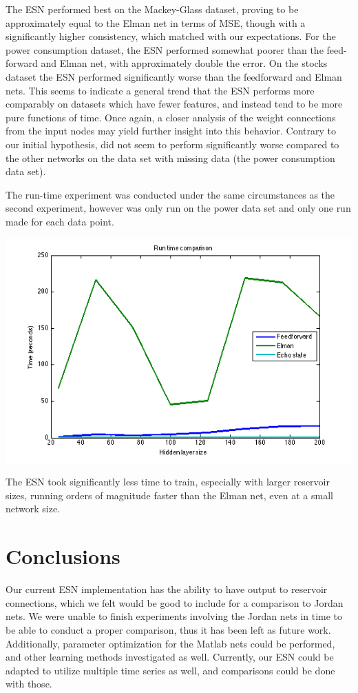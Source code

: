 \documentclass{acm_proc_article-sp}
\begin{document}
The ESN performed best on the Mackey-Glass dataset, proving to be approximately equal to the Elman net in terms of MSE, though with a significantly higher consistency, which matched with our expectations. For the power consumption dataset, the ESN performed somewhat poorer than the feed-forward and Elman net, with approximately double the error. On the stocks dataset the ESN performed significantly worse than the feedforward and Elman nets. This seems to indicate a general trend that the ESN performs more comparably on datasets which have fewer features, and instead tend to be more pure functions of time. Once again, a closer analysis of the weight connections from the input nodes may yield further insight into this behavior. Contrary to our initial hypothesis, did not seem to perform significantly worse compared to the other networks on the data set with missing data (the power consumption data set). 

The run-time experiment was conducted under the same circumstances as the second experiment, however was only run on the power data set and only one run made for each data point.

\begin{center}
\includegraphics[scale=0.45]{time_plot.png}
\end{center}

The ESN took significantly less time to train, especially with larger reservoir sizes, running orders of magnitude faster than the Elman net, even at a small network size.

\section{Conclusions}
Our current ESN implementation has the ability to have output to reservoir connections, which we felt would be good to include for a comparison to Jordan nets. We were unable to finish experiments involving the Jordan nets in time to be able to conduct a proper comparison, thus it has been left as future work. Additionally, parameter optimization for the Matlab nets could be performed, and other learning methods investigated as well. Currently, our ESN could be adapted to utilize multiple time series as well, and comparisons could be done with those.
\end{document}
